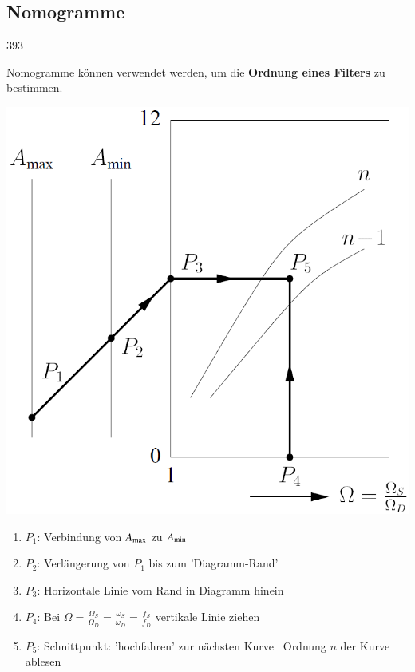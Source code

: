 \subsection{Nomogramme}{393}
\label{Nomogramme}

Nomogramme können verwendet werden, um die \textbf{Ordnung eines Filters}  zu bestimmen.

\begin{minipage}[c]{0.42\columnwidth}
    \includegraphics[width=\columnwidth]{images/filter_nomogramme.png}
\end{minipage}
\hfill
\begin{minipage}[c]{0.56\columnwidth}
    \begin{center}
        \textbf{}
    \end{center}
    
    \begin{enumerate}
        \item $P_1$: Verbindung von $A_{\rm max}$ zu $A_{\rm min}$
        \item $P_2$: Verlängerung von $P_1$ bis zum 'Diagramm-Rand'
        \item $P_3$: Horizontale Linie vom Rand in Diagramm hinein
        \item $P_4$: Bei $\Omega = \frac{\Omega_S}{\Omega_D} = \frac{\omega_S}{\omega_D} = \frac{f_S}{f_D}$ vertikale Linie ziehen
        \item $P_5$: Schnittpunkt: 'hochfahren' zur nächsten Kurve \textrightarrow\ Ordnung $n$ der Kurve ablesen
    \end{enumerate}
\end{minipage}


